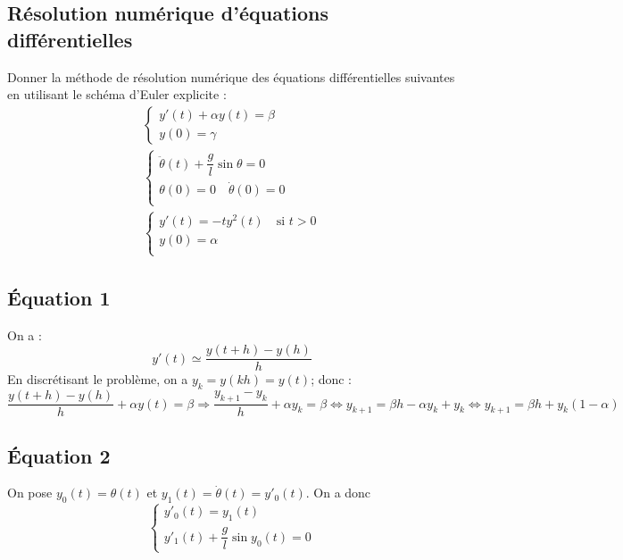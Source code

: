 \documentclass[10pt]{article}
\newif\ifprof
\newif\ifxp
\begin{document}
\ifxp

\else

\fi



 \renewcommand{\baselinestretch}{1.2}
\setlength{\parskip}{2ex plus 0.5ex minus 0.2ex}




\subsection*{Résolution numérique d'équations différentielles}

Donner la méthode de résolution numérique des équations différentielles suivantes en utilisant le schéma d'Euler explicite :
\begin{eqnarray}
\left\{
\begin{array}{l}
y'(t) + \alpha y(t) = \beta \\
y(0) = \gamma
\end{array}
\right. \\
\left\{
\begin{array}{l}
\ddot{\theta}(t) + \dfrac{g}{l}\sin \theta = 0\\
\theta(0) = 0 \quad \dot{\theta}(0) = 0 \\
\end{array} 
\right.\\
\left\{
\begin{array}{l}
y'(t) = -ty^2(t) \quad \text{si }t>0\\
y(0) = \alpha  \\
\end{array} 
\right.
\end{eqnarray}

\ifprof

\subsection*{Équation 1}
On a :
$$
y'(t) \simeq \dfrac{y(t+h)-y(h)}{h}
$$
En discrétisant le problème, on a $y_k=y(kh)=y(t)$; donc : 
$$
\dfrac{y(t+h)-y(h)}{h} + \alpha y(t) = \beta \Longrightarrow 
\dfrac{y_{k+1}-y_k}{h} + \alpha y_k = \beta \Longleftrightarrow 
y_{k+1}  = \beta h - \alpha y_k + y_k \Longleftrightarrow 
y_{k+1}  = \beta h + y_k\left(1 - \alpha \right) 
$$

\subsection*{Équation 2}
On pose $y_0(t) = \theta(t) $ et $y_1(t) = \dot{\theta}(t) = y'_0(t) $. On a donc 
$$
\left\{
\begin{array}{l}
y'_0(t) = y_1(t) \\
y'_1(t) + \dfrac{g}{l} \sin y_0(t) = 0
\end{array} 
\right.
$$
\end{document}
